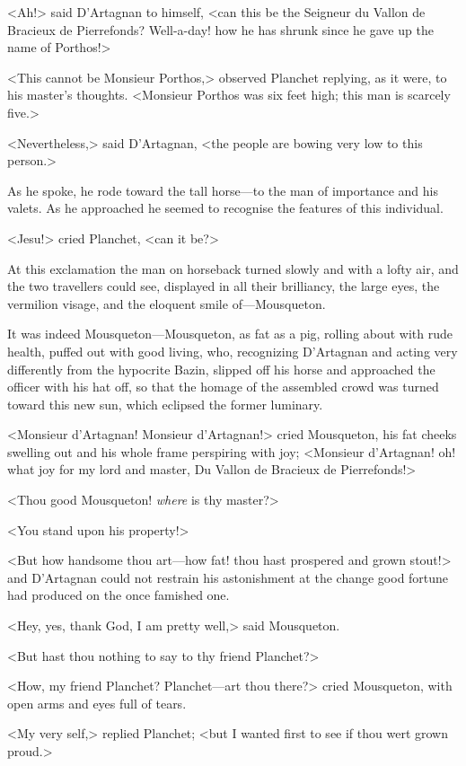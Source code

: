 <Ah!> said D'Artagnan to himself, <can this be the Seigneur du Vallon de Bracieux de Pierrefonds? Well-a-day! how he has shrunk since he gave up the name of Porthos!>

<This cannot be Monsieur Porthos,> observed Planchet replying, as it were, to his master's thoughts. <Monsieur Porthos was six feet high; this man is scarcely five.>

<Nevertheless,> said D'Artagnan, <the people are bowing very low to this person.>

As he spoke, he rode toward the tall horse—to the man of importance and his valets. As he approached he seemed to recognise the features of this individual.

<Jesu!> cried Planchet, <can it be?>

At this exclamation the man on horseback turned slowly and with a lofty air, and the two travellers could see, displayed in all their brilliancy, the large eyes, the vermilion visage, and the eloquent smile of—Mousqueton.

It was indeed Mousqueton—Mousqueton, as fat as a pig, rolling about with rude health, puffed out with good living, who, recognizing D'Artagnan and acting very differently from the hypocrite Bazin, slipped off his horse and approached the officer with his hat off, so that the homage of the assembled crowd was turned toward this new sun, which eclipsed the former luminary.

<Monsieur d'Artagnan! Monsieur d'Artagnan!> cried Mousqueton, his fat cheeks swelling out and his whole frame perspiring with joy; <Monsieur d'Artagnan! oh! what joy for my lord and master, Du Vallon de Bracieux de Pierrefonds!>

<Thou good Mousqueton! \emph{where} is thy master?>

<You stand upon his property!>

<But how handsome thou art—how fat! thou hast prospered and grown stout!> and D'Artagnan could not restrain his astonishment at the change good fortune had produced on the once famished one.

<Hey, yes, thank God, I am pretty well,> said Mousqueton.

<But hast thou nothing to say to thy friend Planchet?>

<How, my friend Planchet? Planchet—art thou there?> cried Mousqueton, with open arms and eyes full of tears.

<My very self,> replied Planchet; <but I wanted first to see if thou wert grown proud.>


